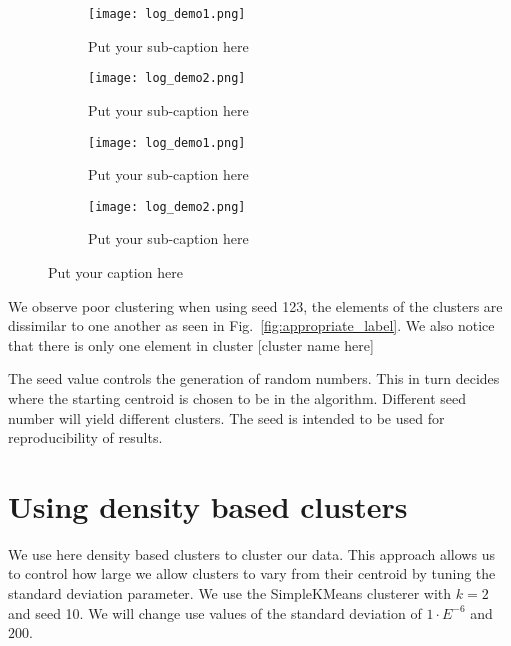 \documentclass[letterpaper,12pt]{article}
\begin{document}
\begin{figure}
\begin{subfigure}{.5\textwidth}
  \centering
  \texttt{[image: log\_demo1.png]}  
  \caption{Put your sub-caption here}
  \label{fig:sub-first}
\end{subfigure}
\begin{subfigure}{.5\textwidth}
  \centering
  \texttt{[image: log\_demo2.png]}  
  \caption{Put your sub-caption here}
  \label{fig:sub-second}
\end{subfigure}

\newline

\begin{subfigure}{.5\textwidth}
  \centering
  \texttt{[image: log\_demo1.png]}  
  \caption{Put your sub-caption here}
  \label{fig:sub-third}
\end{subfigure}
\begin{subfigure}{.5\textwidth}
  \centering
  \texttt{[image: log\_demo2.png]}  
  \caption{Put your sub-caption here}
  \label{fig:sub-fourth}
\end{subfigure}
\caption{Put your caption here}
\label{fig:fig}
\end{figure}

We observe poor clustering when using seed 123, the elements of the clusters are dissimilar to one another as seen in Fig.~\ref{fig:appropriate_label}. We also notice that there is only one element in cluster [cluster name here]


The seed value controls the generation of random numbers. This in turn decides where the starting centroid is chosen to be in the algorithm. Different seed number will yield different clusters. The seed is intended to be used for reproducibility of results.

\section{Using density based clusters}

We use here density based clusters to cluster our data. This approach allows us to control how large we allow clusters to vary from their centroid by tuning the standard deviation parameter. We use the SimpleKMeans clusterer with $k = 2$ and seed 10. We will change use values of the standard deviation of $1 \cdot E^{-6}$ and $200$.
\end{document}
